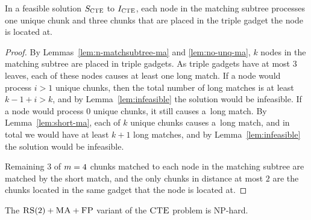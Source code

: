 \begin{lemma}
  In a feasible solution $S_{\mathrm{\textsc{CTE}}}$ to $I_{\mathrm{\textsc{CTE}}}$, each node in the matching subtree processes one unique chunk and three chunks that are placed in the triple gadget the node is located at.
  \label{lem:one-unique-per-node}
\end{lemma}
\begin{proof}
  By Lemmas~\ref{lem:n-matchsubtree-ma} and \ref{lem:no-unq-ma}, $k$ nodes in the matching subtree are placed in triple gadgets.
  As triple gadgets have at most $3$ leaves, each of these nodes causes at least one long match.
  If a node would process $i>1$ unique chunks, then the total number of long matches is at least $k-1+i>k$, and by Lemma~\ref{lem:infeasible} the solution would be infeasible.
  If a node would process $0$ unique chunks, it still causes a~long match.
  By Lemma~\ref{lem:short-ma}, each of $k$ unique chunks causes a~long match, and in total we would have at least $k+1$ long matches,  and by Lemma~\ref{lem:infeasible} the solution would be infeasible.

  Remaining $3$ of $m=4$ chunks matched to each node in the matching subtree are matched by the short match, and the only chunks in distance at most $2$ are the chunks located in the same gadget that the node is located at.
\end{proof}

\begin{theorem}
  The $\textsc{RS}(2)+\textsc{MA}+\textsc{FP}$ variant of the $\textsc{CTE}$ problem is NP-hard.
  \label{th:ma-reduction}
\end{theorem}

